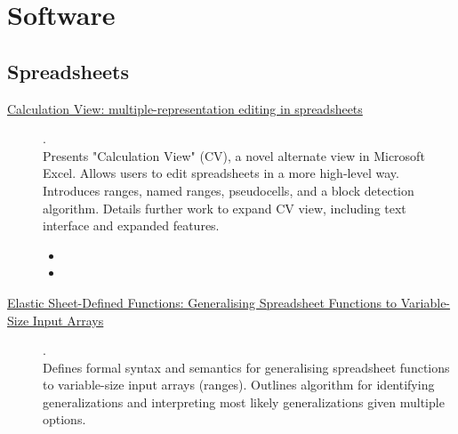 \chapter {Software}

\section{Spreadsheets}

\begin{description}
  \item[\href{https://advait.org/files/sarkar_2018_calcview.pdf}{Calculation View: multiple-representation editing in spreadsheets}] {\cite{sarkar2018calculation}.
    \\ Presents "Calculation View" (CV), a novel alternate view in Microsoft Excel. Allows users to edit spreadsheets in a more high-level way. Introduces ranges, named ranges, pseudocells, and a block detection algorithm. Details further work to expand CV view, including text interface and expanded features.
    \begin{itemize}
      \item {}
      \item {}
    \end{itemize}
    }
  \item[\href{https://www.microsoft.com/en-us/research/uploads/prod/2018/11/elastic-sdfs-5bfd1d48e9dd2.pdf}{Elastic Sheet-Defined Functions: Generalising Spreadsheet Functions to Variable-Size Input Arrays}] {\cite{elastic-sheet-defined-functions-generalising-spreadsheet-functions-to-variable-size-input-arrays}.
    \\ Defines formal syntax and semantics for generalising spreadsheet functions to variable-size input arrays (ranges). Outlines algorithm for identifying generalizations and interpreting most likely generalizations given multiple options.
    }
\end{description}